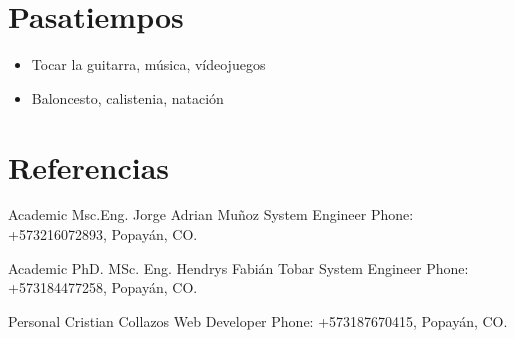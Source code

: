 \documentclass[american]{cv-class}
\begin{document}
\newpage
\section{Pasatiempos}
    \begin{itemize}
        \item
        {Tocar la guitarra, música, vídeojuegos}
        \item
        {Baloncesto, calistenia, natación}
        \\
    \end{itemize}



    	
    	

\section{Referencias}
\begin{entrylist}
	
	\entry
	{Academic}
	{Msc.Eng. Jorge Adrian Muñoz}
	{System Engineer} 
	{Phone: +573216072893, Popayán, CO.}

	\entry
	{Academic}
	{PhD. MSc. Eng. Hendrys Fabián Tobar}
	{System Engineer} 
	{Phone: +573184477258, Popayán, CO.}
	
	\entry
    {Personal}
	{Cristian Collazos}
	{Web Developer} 
	{Phone: +573187670415, Popayán, CO.}

%	
%

\end{entrylist}
\end{document}
